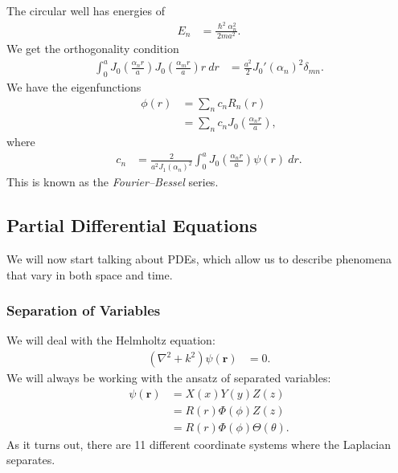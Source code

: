 \documentclass[10pt]{mypackage}
\renewcommand*{\hbar}{\hslash}
\begin{document}
\begin{example}
      The circular well has energies of
      \begin{align*}
        E_n &= \frac{\hbar^2\alpha_n^2}{2ma^2}.
      \end{align*}
      We get the orthogonality condition
      \begin{align*}
        \int_{0}^{a} J_0\left( \frac{\alpha_n r}{a} \right) J_0\left( \frac{\alpha_m r}{a} \right)r\:dr &= \frac{a^2}{2}J_0'\left( \alpha_n \right)^2\delta_{mn}.
      \end{align*}
      We have the eigenfunctions
      \begin{align*}
        \phi\left( r \right) &= \sum_{n}c_nR_n(r)\\
                             &= \sum_{n}c_nJ_0\left( \frac{\alpha_n r}{a} \right),
      \end{align*}
      where
      \begin{align*}
        c_n &= \frac{2}{a^2J_1\left( \alpha_n \right)^2} \int_{0}^{a} J_0\left( \frac{\alpha_n r}{a} \right)\psi\left( r \right)\:dr.
      \end{align*}
      This is known as the \textit{Fourier--Bessel} series.
    \end{example}
  \subsection{Partial Differential Equations}%
  We will now start talking about PDEs, which allow us to describe phenomena that vary in both space and time. 
  \subsubsection{Separation of Variables}%
  We will deal with the Helmholtz equation:
  \begin{align*}
    \left( \nabla^2 + k^2 \right)\psi\left( \mathbf{r} \right) &= 0.
  \end{align*}
  We will always be working with the ansatz of separated variables:
  \begin{align*}
    \psi\left( \mathbf{r} \right) &= X(x)Y(y)Z(z)\\
                                  &= R(r)\Phi(\phi)Z(z)\\
                                  &= R(r)\Phi(\phi)\Theta(\theta).
  \end{align*}
  As it turns out, there are 11 different coordinate systems where the Laplacian separates.\newline
\end{document}
